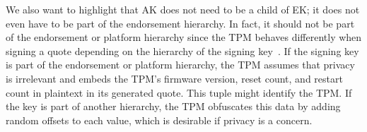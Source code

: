 We also want to highlight that AK does not need to be a child of EK\@; it does not even have to be part of the endorsement hierarchy.
In fact, it should not be part of the endorsement or platform hierarchy since the TPM behaves differently when signing a quote depending on the hierarchy of the signing key~\cite{tpm20}.
If the signing key is part of the endorsement or platform hierarchy, the TPM assumes that privacy is irrelevant and embeds the TPM's firmware version, reset count, and restart count in plaintext in its generated quote.
This tuple might identify the TPM\@.
If the key is part of another hierarchy, the TPM obfuscates this data by adding random offsets to each value, which is desirable if privacy is a concern.

